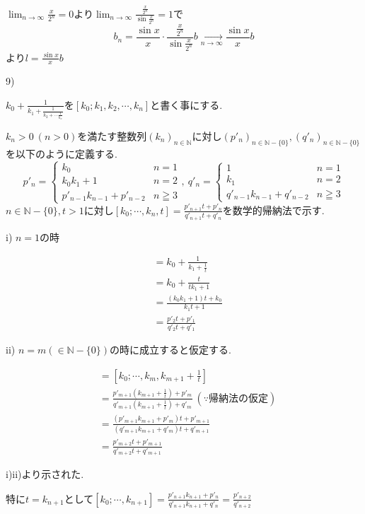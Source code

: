 \documentclass{jsarticle}
\begin{document}
$\displaystyle \lim_{n\to\infty}\frac{x}{2^n}=0$より$\displaystyle \lim_{n\to\infty}\frac{\frac{x}{2^n}}{\sin \frac{x}{2^n}}=1$で
\[b_n= \frac{\sin x}{x}\cdot\frac{\frac{x}{2^n}}{\sin \frac{x}{2^n}}b\xrightarrow[n\to\infty]{} \frac{\sin x}{x}b\]
より$l=\frac{\sin x}{x}b$

9)

$k_0+\frac{1}{k_1+\frac{1}{k_2+\cdots \frac{1}{k_n}}}$を$[k_0;k_1,k_2,\cdots,k_n]$と書く事にする.

$k_n>0 \ (n > 0)$を満たす整数列$(k_n)_{n\in\mathbb{N}}$に対し$(p'_n)_{n\in\mathbb{N}-\{0\}},(q'_n)_{n\in\mathbb{N}-\{0\}}$を以下のように定義する.
\[p'_n=\begin{cases}
k_0 & n=1 \\
k_0k_1+1 & n=2 \\
p'_{n-1}k_{n-1}+p'_{n-2} & n\geqq 3
\end{cases}, \ q'_n=\begin{cases}
1 & n=1 \\
k_1 & n=2 \\
q'_{n-1}k_{n-1}+q'_{n-2} & n\geqq 3
\end{cases}\]
$n\in \mathbb{N}-\{0\},t>1$に対し$[k_0;\cdots ,k_n,t]=\frac{p'_{n+1}t+p'_n}{q'_{n+1}t+q'_n}$を数学的帰納法で示す.

i) $n=1$の時

\begin{align*}
[k_0;k_1,t]&=k_0+\frac{1}{k_1+\frac{1}{t}}\\
&=k_0+\frac{t}{tk_1+1}\\
&=\frac{(k_0k_1+1)t+k_0}{k_1t+1}\\
&=\frac{p'_2t+p'_1}{q'_2t+q'_1}
\end{align*}

ii) $n=m(\in \mathbb{N}-\{0\})$の時に成立すると仮定する.

\begin{align*}
[k_0;\cdots ,k_{m+1},t]&=[k_0;\cdots ,k_{m},k_{m+1}+\frac{1}{t}]\\
&=\frac{p'_{m+1}(k_{m+1}+\frac{1}{t})+p'_m}{q'_{m+1}(k_{m+1}+\frac{1}{t})+q'_m} \ (\because 帰納法の仮定)\\
&=\frac{(p'_{m+1}k_{m+1}+p'_m)t+p'_{m+1}}{(q'_{m+1}k_{m+1}+q'_m)t+q'_{m+1}}\\
&=\frac{p'_{m+2}t+p'_{m+1}}{q'_{m+2}t+q'_{m+1}}
\end{align*}

i)ii)より示された.

特に$t=k_{n+1}$として$[k_0;\cdots ,k_{n+1}]=\frac{p'_{n+1}k_{n+1}+p'_n}{q'_{n+1}k_{n+1}+q'_n}=\frac{p'_{n+2}}{q'_{n+2}}$
\end{document}
